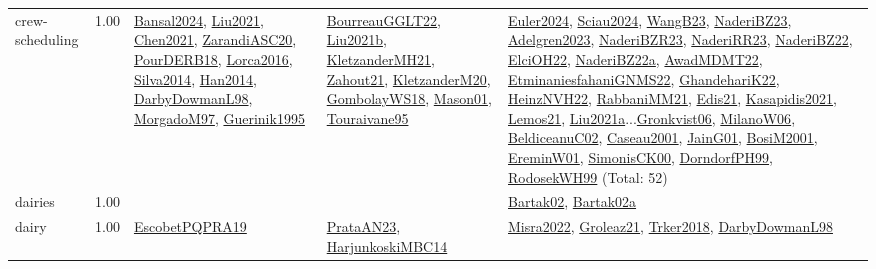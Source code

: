 {\begin{longtable}{p{3cm}r>{\raggedright\arraybackslash}p{6cm}>{\raggedright\arraybackslash}p{6cm}>{\raggedright\arraybackslash}p{8cm}}
\index{crew-scheduling}\index{ApplicationAreas!crew-scheduling}crew-scheduling &  1.00 & \hyperref[detail:Bansal2024]{Bansal2024}, \hyperref[detail:Liu2021]{Liu2021}, \hyperref[detail:Chen2021]{Chen2021}, \hyperref[detail:ZarandiASC20]{ZarandiASC20}, \hyperref[detail:PourDERB18]{PourDERB18}, \hyperref[detail:Lorca2016]{Lorca2016}, \hyperref[detail:Silva2014]{Silva2014}, \hyperref[detail:Han2014]{Han2014}, \hyperref[detail:DarbyDowmanL98]{DarbyDowmanL98}, \hyperref[detail:MorgadoM97]{MorgadoM97}, \hyperref[detail:Guerinik1995]{Guerinik1995} & \hyperref[detail:BourreauGGLT22]{BourreauGGLT22}, \hyperref[detail:Liu2021b]{Liu2021b}, \hyperref[detail:KletzanderMH21]{KletzanderMH21}, \hyperref[detail:Zahout21]{Zahout21}, \hyperref[detail:KletzanderM20]{KletzanderM20}, \hyperref[detail:GombolayWS18]{GombolayWS18}, \hyperref[detail:Mason01]{Mason01}, \hyperref[detail:Touraivane95]{Touraivane95} & \hyperref[detail:Euler2024]{Euler2024}, \hyperref[detail:Sciau2024]{Sciau2024}, \hyperref[detail:WangB23]{WangB23}, \hyperref[detail:NaderiBZ23]{NaderiBZ23}, \hyperref[detail:Adelgren2023]{Adelgren2023}, \hyperref[detail:NaderiBZR23]{NaderiBZR23}, \hyperref[detail:NaderiRR23]{NaderiRR23}, \hyperref[detail:NaderiBZ22]{NaderiBZ22}, \hyperref[detail:ElciOH22]{ElciOH22}, \hyperref[detail:NaderiBZ22a]{NaderiBZ22a}, \hyperref[detail:AwadMDMT22]{AwadMDMT22}, \hyperref[detail:EtminaniesfahaniGNMS22]{EtminaniesfahaniGNMS22}, \hyperref[detail:GhandehariK22]{GhandehariK22}, \hyperref[detail:HeinzNVH22]{HeinzNVH22}, \hyperref[detail:RabbaniMM21]{RabbaniMM21}, \hyperref[detail:Edis21]{Edis21}, \hyperref[detail:Kasapidis2021]{Kasapidis2021}, \hyperref[detail:Lemos21]{Lemos21}, \hyperref[detail:Liu2021a]{Liu2021a}...\hyperref[detail:Gronkvist06]{Gronkvist06}, \hyperref[detail:MilanoW06]{MilanoW06}, \hyperref[detail:BeldiceanuC02]{BeldiceanuC02}, \hyperref[detail:Caseau2001]{Caseau2001}, \hyperref[detail:JainG01]{JainG01}, \hyperref[detail:BosiM2001]{BosiM2001}, \hyperref[detail:EreminW01]{EreminW01}, \hyperref[detail:SimonisCK00]{SimonisCK00}, \hyperref[detail:DorndorfPH99]{DorndorfPH99}, \hyperref[detail:RodosekWH99]{RodosekWH99} (Total: 52)\\
\index{dairies}\index{ApplicationAreas!dairies}dairies &  1.00 &  &  & \hyperref[detail:Bartak02]{Bartak02}, \hyperref[detail:Bartak02a]{Bartak02a}\\
\index{dairy}\index{ApplicationAreas!dairy}dairy &  1.00 & \hyperref[detail:EscobetPQPRA19]{EscobetPQPRA19} & \hyperref[detail:PrataAN23]{PrataAN23}, \hyperref[detail:HarjunkoskiMBC14]{HarjunkoskiMBC14} & \hyperref[detail:Misra2022]{Misra2022}, \hyperref[detail:Groleaz21]{Groleaz21}, \hyperref[detail:Trker2018]{Trker2018}, \hyperref[detail:DarbyDowmanL98]{DarbyDowmanL98}\\

\end{longtable}}
